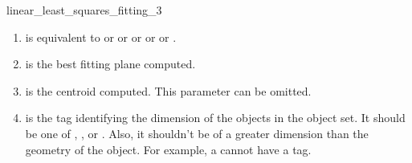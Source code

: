 \begin{ccRefFunction}{linear_least_squares_fitting_3}
\begin{enumerate}
   \item  {} is equivalent to  or
           or  or  or
           or .
   \item  {} is the best fitting plane computed.
   \item  {} is the centroid computed. This parameter can be
          omitted.
   \item  {} is the tag identifying the dimension of the objects in the object set. It should be one of , ,  or . Also, it shouldn't be of a greater dimension than the geometry of the object. For example, a  cannot have a  tag.
\end{enumerate}

\end{ccRefFunction}
